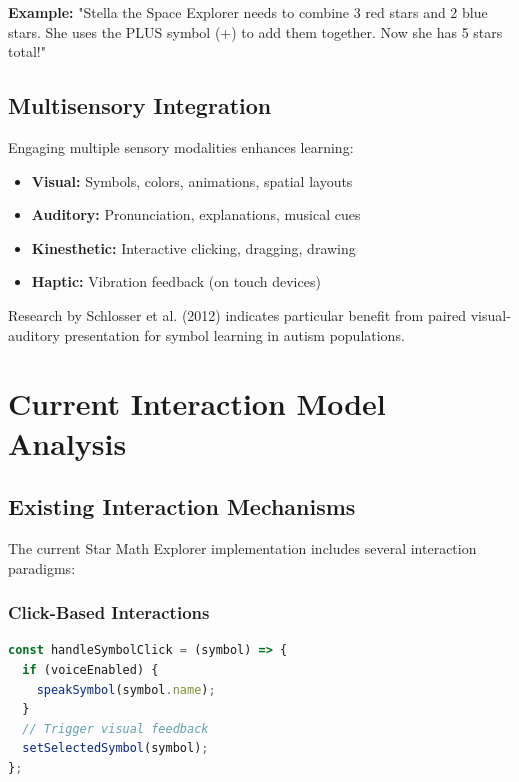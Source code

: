 \documentclass[12pt, a4paper]{article}
\begin{document}
\textbf{Example:} "Stella the Space Explorer needs to combine 3 red stars and 2 blue stars. She uses the PLUS symbol (+) to add them together. Now she has 5 stars total!"

\subsection{Multisensory Integration}

Engaging multiple sensory modalities enhances learning:

\begin{itemize}[leftmargin=*]
    \item \textbf{Visual:} Symbols, colors, animations, spatial layouts
    \item \textbf{Auditory:} Pronunciation, explanations, musical cues
    \item \textbf{Kinesthetic:} Interactive clicking, dragging, drawing
    \item \textbf{Haptic:} Vibration feedback (on touch devices)
\end{itemize}

Research by Schlosser et al. (2012) indicates particular benefit from paired visual-auditory presentation for symbol learning in autism populations.

\newpage

\section{Current Interaction Model Analysis}

\subsection{Existing Interaction Mechanisms}

The current Star Math Explorer implementation includes several interaction paradigms:

\subsubsection{Click-Based Interactions}

\begin{lstlisting}[language=JavaScript, caption=Current Click Handler]
const handleSymbolClick = (symbol) => {
  if (voiceEnabled) {
    speakSymbol(symbol.name);
  }
  // Trigger visual feedback
  setSelectedSymbol(symbol);
};
\end{lstlisting}
\end{document}
